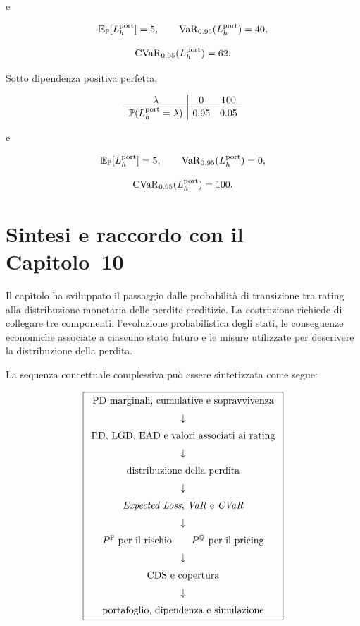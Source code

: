 \begin{exercise}
e

\[
\mathbb{E}_{\mathbb{P}}[L_h^{\mathrm{port}}]=5,
\qquad
\operatorname{VaR}_{0.95}(L_h^{\mathrm{port}})=40,
\]

\[
\operatorname{CVaR}_{0.95}(L_h^{\mathrm{port}})=62.
\]

Sotto dipendenza positiva perfetta,

\[
\begin{array}{c|cc}
\lambda
&
0
&
100
\\
\hline
\mathbb{P}(L_h^{\mathrm{port}}=\lambda)
&
0.95
&
0.05
\end{array}
\]

e

\[
\mathbb{E}_{\mathbb{P}}[L_h^{\mathrm{port}}]=5,
\qquad
\operatorname{VaR}_{0.95}(L_h^{\mathrm{port}})=0,
\]

\[
\operatorname{CVaR}_{0.95}(L_h^{\mathrm{port}})=100.
\]

\end{exercise}

\section{Sintesi e raccordo con il Capitolo~10}

\label{sec:cap09-sintesi-raccordo}

Il capitolo ha sviluppato il passaggio dalle probabilit\`{a} di
transizione tra rating alla distribuzione monetaria delle perdite
creditizie. La costruzione richiede di collegare tre componenti:
l'evoluzione probabilistica degli stati, le conseguenze economiche
associate a ciascuno stato futuro e le misure utilizzate per descrivere
la distribuzione della perdita.

La sequenza concettuale complessiva pu\`{o} essere sintetizzata come
segue:

\[
\boxed{
\begin{array}{c}
\text{PD marginali, cumulative e sopravvivenza}
\\[2mm]
\downarrow
\\[2mm]
\text{PD, LGD, EAD e valori associati ai rating}
\\[2mm]
\downarrow
\\[2mm]
\text{distribuzione della perdita}
\\[2mm]
\downarrow
\\[2mm]
\text{\emph{Expected Loss}, \emph{VaR} e \emph{CVaR}}
\\[2mm]
\downarrow
\\[2mm]
P^{\mathbb{P}}\ \text{per il rischio}
\qquad
P^{\mathbb{Q}}\ \text{per il pricing}
\\[2mm]
\downarrow
\\[2mm]
\text{CDS e copertura}
\\[2mm]
\downarrow
\\[2mm]
\text{portafoglio, dipendenza e simulazione}
\end{array}
}
\]

